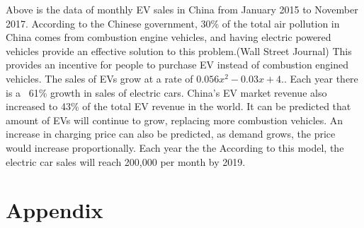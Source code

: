 \documentclass[10pt]{article}
\begin{document}
Above is the data of monthly EV sales in China from January 2015 to November 2017. According to the Chinese government, 30\% of the total air pollution in China comes from combustion engine vehicles, and having electric powered vehicles provide an effective solution to this problem.(Wall Street Journal) This provides an incentive for people to purchase EV instead of combustion engined vehicles. The sales of EVs grow at a rate of $0.056x^2-0.03x+4.$. Each year there is a ~61\% growth in sales of electric cars. China’s EV market revenue also increased to 43\% of the total EV revenue in the world. It can be predicted that amount of EVs will continue to grow, replacing more combustion vehicles. An increase in charging price can also be predicted, as demand grows, the price would increase proportionally. Each year the the  According to this model, the electric car sales will reach 200,000 per month by 2019.

\newpage
\part{Appendix}
\appendix
\end{document}
